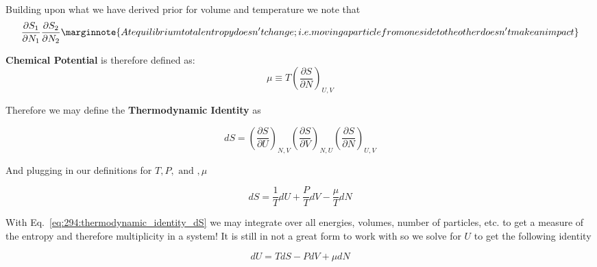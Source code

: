 \documentclass[10pt]{article}
\begin{document}
Building upon what we have derived prior for volume and temperature we note that 
\begin{equation}
	\frac{\partial S_1}{\partial N_1} \frac{\partial S_2}{\partial N_2} 
	\marginnote{At equilibrium total entropy doesn't change; i.e. moving a particle from one side to the other doesn't make an impact}
\end{equation}

\begin{definition}
\textbf{	Chemical Potential} is therefore defined as:
	\begin{equation}
		\mu \equiv T(\frac{\partial S}{\partial N} ) _{U, V}
		\label{eq:294:def_chem_potential}
	\end{equation}

\end{definition}

\begin{theorem}
	Therefore we may define the \textbf{Thermodynamic Identity} as 

	\begin{equation}
		dS = \left( \frac{\partial S}{\partial U}  \right)_{N, V} \left( \frac{\partial S}{\partial V}  \right)_{N, U} \left( \frac{\partial S}{\partial N}  \right)_{U, V}
		\label{eq:294:thermodynamic_identity_full}
	\end{equation}

	And plugging in our definitions for $ T, P, \text{ and }, \mu$ 

	\begin{equation}
		dS = \frac{1}{T} dU + \frac{P}{T} dV - \frac{\mu}{T} dN
		\label{eq:294:thermodynamic_identity_dS}
	\end{equation}

	With Eq.~\ref{eq:294:thermodynamic_identity_dS} we may integrate over all energies, volumes, number of particles, etc. to get a measure of the entropy and therefore multiplicity in a system!
	It is still in not a great form to work with so we solve for $ U $  to get the following identity

	\begin{equation}
		dU = TdS - PdV + \mu dN
		\label{eq:294:thermodynamic_identity}
	\end{equation}
\end{theorem}
\end{document}
